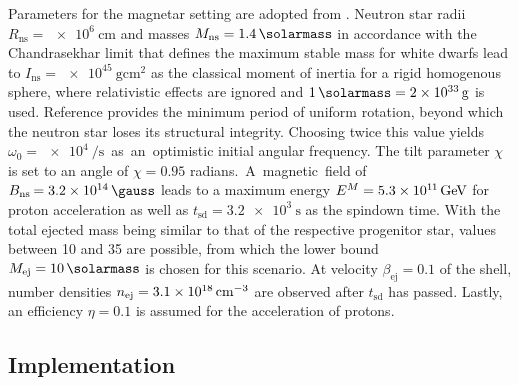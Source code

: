 Parameters for the magnetar setting are adopted from \cite{Carpio_2020}. Neutron star radii $R_\text{ns} = \qty{e6}{\centi\meter}$
and masses $M_\text{ns} = \qty{1.4}{\solarmass}$ in accordance with the Chandrasekhar limit that defines the maximum stable mass for
white dwarfs lead to $I_\text{ns} = \qty{e45}{\gram\centi\meter\squared}$ as the classical moment of inertia for a rigid homogenous
sphere, where relativistic effects are ignored and $\qty{1}{\solarmass} = \qty{2e33}{\gram}$ is used. Reference \cite{Haensel_1999}
provides the minimum period of uniform rotation, beyond which the neutron star loses its structural integrity. Choosing twice this
value yields $\omega_0 = \qty{e4}{\per\second}$~as~an~optimistic initial angular frequency. The tilt parameter $\chi$ is set to an
angle of $\chi = \num{0.95}$ radians.~A~magnetic~field of~$B_\text{ns} \kern-0.75pt = \qty{3.2e14}{\gauss}$ leads to a maximum energy
$E^M = \num{5.3} \times 10^{1 \kern-0.3pt 1} \kern+1.5pt \unit{\giga\electronvolt}$ for proton acceleration as well as
$t_\text{sd} = \qty{3.2e3}{\second}$ as the spindown time. With the total ejected mass being similar to that of the
respective progenitor star, values between \qty{10}{\solarmass} and \qty{35}{\solarmass} are possible, from which
the lower bound $M_\text{ej} = \qty{10}{\solarmass}$ is chosen for this scenario. At velocity $\beta_\text{ej} = \num{0.1}$
of the shell, number densities $n_\text{ej} = \smash{\qty{3.1e18}{\per\centi\meter\cubed}}$ are  observed after $t_\text{sd}$
has passed. Lastly, an efficiency $\eta = \num{0.1}$ is assumed for the acceleration of protons.



\subsection{Implementation}
\label{sub:implementation}

